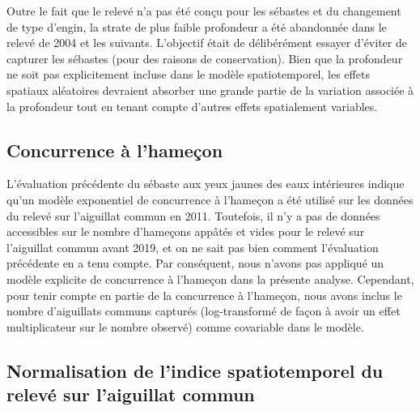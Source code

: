 \documentclass[french,11pt]{book}
\begin{document}
Outre le fait que le relevé n'a pas été conçu pour les sébastes et du changement de type d'engin, la strate de plus faible profondeur a été abandonnée dans le relevé de 2004 et les suivants. L'objectif était de délibérément essayer d'éviter de capturer les sébastes (pour des raisons de conservation). Bien que la profondeur ne soit pas explicitement incluse dans le modèle spatiotemporel, les effets spatiaux aléatoires devraient absorber une grande partie de la variation associée à la profondeur tout en tenant compte d'autres effets spatialement variables.

\hypertarget{sec:dog-hook-competition}{%
\subsection{Concurrence à l'hameçon}\label{sec:dog-hook-competition}}

L'évaluation précédente du sébaste aux yeux jaunes des eaux intérieures indique qu'un modèle exponentiel de concurrence à l'hameçon a été utilisé sur les données du relevé sur l'aiguillat commun en 2011. Toutefois, il n'y a pas de données accessibles sur le nombre d'hameçons appâtés et vides pour le relevé sur l'aiguillat commun avant 2019, et on ne sait pas bien comment l'évaluation précédente en a tenu compte. Par conséquent, nous n'avons pas appliqué un modèle explicite de concurrence à l'hameçon dans la présente analyse. Cependant, pour tenir compte en partie de la concurrence à l'hameçon, nous avons inclus le nombre d'aiguillats communs capturés (log-transformé de façon à avoir un effet multiplicateur sur le nombre observé) comme covariable dans le modèle.

\hypertarget{sec:dog-index-model}{%
\subsection{Normalisation de l'indice spatiotemporel du relevé sur l'aiguillat commun}\label{sec:dog-index-model}}
\end{document}
